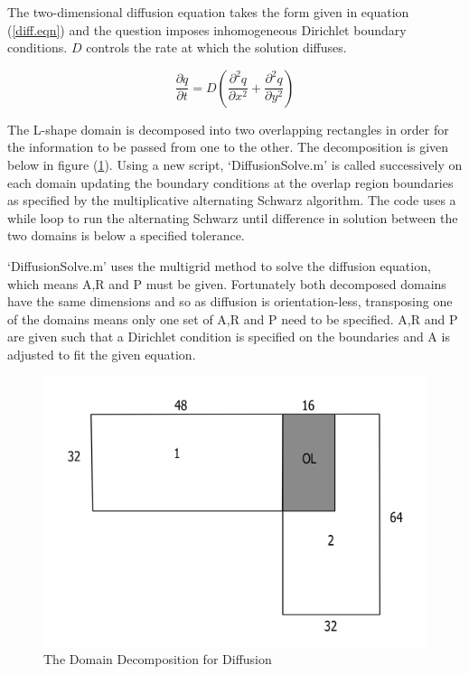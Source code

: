 \documentclass[11pt,a4paper,notitlepage]{article}
\begin{document}
The two-dimensional diffusion equation takes the form given in equation (\ref{diff.eqn}) and the question imposes inhomogeneous Dirichlet boundary conditions. $D$ controls the rate at which the solution diffuses.

\begin{equation}\label{diff.eqn}
\frac{\partial q}{\partial t} = D\left(\frac{\partial ^2 q}{\partial x^2} + \frac{\partial^2 q}{\partial y^2}\right)
\end{equation}

The L-shape domain is decomposed into two overlapping rectangles in order for the information to be passed from one to the other. The decomposition is given below in  figure (\ref{diff.decomp}). Using a new script, `DiffusionSolve.m' is called successively on each domain updating the boundary conditions at the overlap region boundaries as specified by the multiplicative alternating Schwarz algorithm. The code uses a while loop to run the alternating Schwarz until difference in solution between the two domains is below a specified tolerance.

	`DiffusionSolve.m' uses the multigrid method to solve the diffusion equation, which means A,R and P must be given. Fortunately both decomposed domains have the same dimensions and so as diffusion is orientation-less, transposing one of the domains means only one set of A,R and P need to be specified. A,R and P are given such that a Dirichlet condition is specified on the boundaries and A is adjusted to fit the given equation. 

\begin{figure}[h]
\vspace{-10pt}
\includegraphics[width=.9\linewidth]{LShapeDomain2.jpeg}
\vspace{-20pt}
\caption{The Domain Decomposition for Diffusion}
\label{diff.decomp}
\end{figure}
\end{document}
